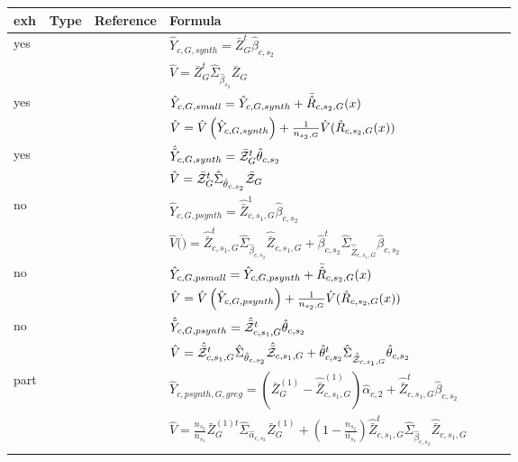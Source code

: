 \begin{table}
    \centering
\begin{tabular}{l l l l l r l}
	 exh 	&  Type 	&  Reference & Formula\\ \toprule
			
     yes 	&  \psynthetic{} 	& \analogy{} & $\hat{Y}_{c,G,synth} = \bar{Z}^t_G\hat{\beta}_{c,s_2}$ \\
	   	&    	& \analogy{} & $\hat{V} = \bar{Z}^t_G \hat{\Sigma}_{ \hat{\beta}_{s_2}} \bar{Z}_G $\\
\lightrule
			
yes 	&  \psmall{} 	& \analogy{} & $ \hat{Y}_{c,G,small} = \hat{Y}_{c,G,synth} + \bar{\hat{R}}_{c,s_2,G}(x)$\\
	   	&    	& \analogy{} & $  \hat{V} = \hat{V}\left(\hat{Y}_{c,G,synth}\right) + \frac{1}{n_{s_2,G}}\hat{V}(\hat{R}_{c,s_2,G}(x))$ \\
\lightrule

yes 	&  \pextended{} 	& \cite[eq. 48]{Man13a} & $ \hat{\tilde{Y}}_{c,G,synth} = \bar{\mathcal{Z}}^t_G\hat{\theta}_{c,s_2}$ \\
    &    	& \cite[eq. 49]{Man13a} & $ \hat{V} = \bar{\mathcal{Z}}^t_G \hat{\Sigma}_{ \hat{\theta}_{c,s_2}} \bar{\mathcal{Z}}_G$ \\
			
\strongrule
no 	&  \psynthetic{} 	& \cite[eq. 42]{Man13a} & $ \hat{Y}_{c,G,psynth} = \hat{\bar{Z}}^{1}_{c,s_1,G} \hat{\beta}_{c,s_2}$ \\
        &    	& \cite[eq. 43]{Man13a} & $ \hat{V}(\dot) =\hat{\bar{Z}}^t_{c,s_1,G} \hat{\Sigma}_{ \hat{\beta}_{c,s_2}} \hat{\bar{Z}}_{c,s_1,G} + \hat{\beta}^t_{c,s_2} \hat{\Sigma}_{ \hat{\bar{Z}}_{c,s_1,G}  } \hat{\beta}_{c,s_2} $ \\
\lightrule
			
no 	&  \psmall{} 	& \cite[eq. 44]{Man13a} & $ \hat{Y}_{c,G,psmall} = \hat{Y}_{c,G,psynth} + \bar{\hat{R}}_{c,s_2,G}(x)$ \\
            &      	& \cite[eq. 45]{Man13a} & $ \hat{V} = \hat{V}\left(\hat{Y}_{c,G,psynth}\right) + \frac{1}{n_{s_2,G}}\hat{V}(\hat{R}_{c,s_2,G}(x))$ \\
\lightrule
no 	&  \pextended{} 	& \cite[eq. 46]{Man13a} & $ \hat{\tilde{Y}}_{c,G,psynth} = \hat{\bar{\mathcal{Z}}}^t_{c,s_1,G}\hat{\theta}_{c,s_2}$ \\
    &    	&  \cite[eq. 47]{Man13a} & $ \hat{V} = \hat{\bar{\mathcal{Z}}}^t_{c,s_1,G} \hat{\Sigma}_{ \hat{\theta}_{c,s_2}} \hat{\bar{\mathcal{Z}}}_{c,s_1,G} + \hat{\theta}^t_{c,s_2} \hat{\Sigma}_{ \hat{\bar{\mathcal{Z}}}_{c,s_1,G}  } \hat{\theta}_{c,s_2}$ \\
			
			
\strongrule
part 	&  \psynthetic{} 	& \analogy{} & $\hat{Y}_{c,psynth, G,greg} = \left(
\bar{Z}_G^{(1)}- \hat{\bar{Z}}_{c,s_1,G}^{(1)}\right) \hat{\alpha}_{c,2} + \hat{\bar{Z}}^t_{c,s_1,G}\hat{\beta}_{c,s_2}  $\\
	   	&    	&     \analogy{} & $ \hat{V} = \frac{n_{s_2}}{n_{s_1}}\bar{Z}^{(1)t}_G \hat{\Sigma}_{ \hat{\alpha}_{c,s_2}} \bar{Z}^{(1)}_G + (1-\frac{n_{s_2}}{n_{s_1}})\hat{\bar{Z}}^{t}_{c,s_1,G} \hat{\Sigma}_{ \hat{\beta}_{c,s_2}} \hat{\bar{Z}}_{c,s_1,G} $\\
\lightrule
			

\end{tabular}
\end{table}
